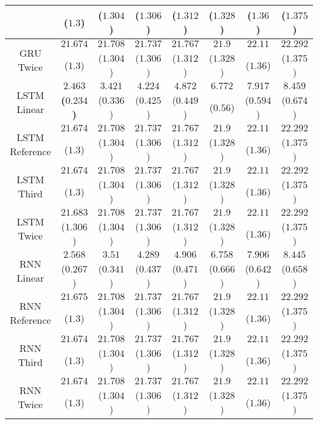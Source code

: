 \begin{table}[!ht]
{\begin{tabular}{|c|c|c|c|c|c|c|c|}
			 & ($1.3$) & ($1.304$) & ($1.306$) & ($1.312$) & ($1.328$) & ($1.36$) & ($1.375$) \\ \hline
			\multirow{2}{*}{GRU Twice} & $21.674$ & $21.708$ & $21.737$ & $21.767$ & $21.9$ & $22.11$ & $22.292$ \\
			 & ($1.3$) & ($1.304$) & ($1.306$) & ($1.312$) & ($1.328$) & ($1.36$) & ($1.375$) \\ \hline
			\multirow{2}{*}{LSTM Linear} & $\mathbf{2.463}$ & $3.421$ & $4.224$ & $4.872$ & $6.772$ & $7.917$ & $8.459$ \\
			 & \textbf{(}$\mathbf{0.234}$\textbf{)} & ($0.336$) & ($0.425$) & ($0.449$) & ($0.56$) & ($0.594$) & ($0.674$) \\ \hline
			\multirow{2}{*}{LSTM Reference} & $21.674$ & $21.708$ & $21.737$ & $21.767$ & $21.9$ & $22.11$ & $22.292$ \\
			 & ($1.3$) & ($1.304$) & ($1.306$) & ($1.312$) & ($1.328$) & ($1.36$) & ($1.375$) \\ \hline
			\multirow{2}{*}{LSTM Third} & $21.674$ & $21.708$ & $21.737$ & $21.767$ & $21.9$ & $22.11$ & $22.292$ \\
			 & ($1.3$) & ($1.304$) & ($1.306$) & ($1.312$) & ($1.328$) & ($1.36$) & ($1.375$) \\ \hline
			\multirow{2}{*}{LSTM Twice} & $21.683$ & $21.708$ & $21.737$ & $21.767$ & $21.9$ & $22.11$ & $22.292$ \\
			 & ($1.306$) & ($1.304$) & ($1.306$) & ($1.312$) & ($1.328$) & ($1.36$) & ($1.375$) \\ \hline
			\multirow{2}{*}{RNN Linear} & $2.568$ & $3.51$ & $4.289$ & $4.906$ & $6.758$ & $7.906$ & $8.445$ \\
			 & ($0.267$) & ($0.341$) & ($0.437$) & ($0.471$) & ($0.666$) & ($0.642$) & ($0.658$) \\ \hline
			\multirow{2}{*}{RNN Reference} & $21.675$ & $21.708$ & $21.737$ & $21.767$ & $21.9$ & $22.11$ & $22.292$ \\
			 & ($1.3$) & ($1.304$) & ($1.306$) & ($1.312$) & ($1.328$) & ($1.36$) & ($1.375$) \\ \hline
			\multirow{2}{*}{RNN Third} & $21.674$ & $21.708$ & $21.737$ & $21.767$ & $21.9$ & $22.11$ & $22.292$ \\
			 & ($1.3$) & ($1.304$) & ($1.306$) & ($1.312$) & ($1.328$) & ($1.36$) & ($1.375$) \\ \hline
			\multirow{2}{*}{RNN Twice} & $21.674$ & $21.708$ & $21.737$ & $21.767$ & $21.9$ & $22.11$ & $22.292$ \\
			 & ($1.3$) & ($1.304$) & ($1.306$) & ($1.312$) & ($1.328$) & ($1.36$) & ($1.375$) \\ \hline

\end{tabular}}
\end{table}
